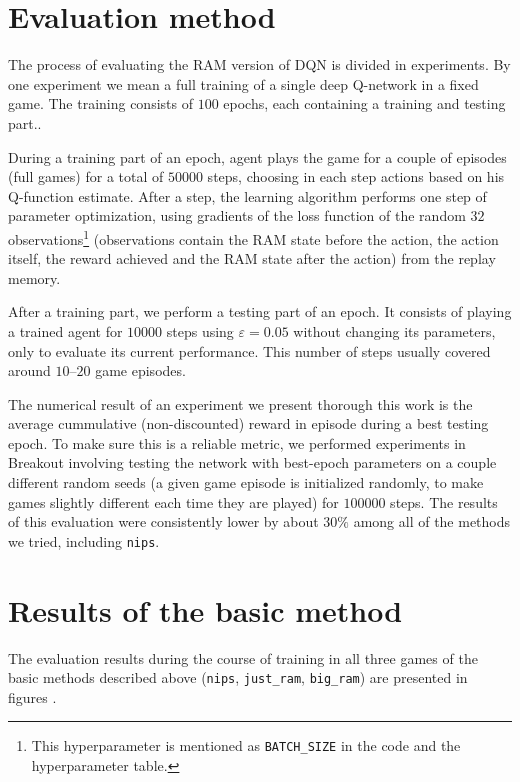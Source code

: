 \section{Evaluation method}
The process of evaluating the RAM version of DQN is divided in experiments. By one experiment we mean a full training of a single deep Q-network in a fixed game. The training consists of $100$ epochs, each containing a training and testing part..

During a training part of an epoch, agent plays the game for a couple of episodes (full games) for a total of $50000$ steps, choosing in each step actions based on his Q-function estimate. After a step, the learning algorithm performs one step of parameter optimization, using gradients of the loss function of the random $32$ observations\footnote{This hyperparameter is mentioned as \texttt{BATCH\_SIZE} in the code and the hyperparameter table.} (observations contain the RAM state before the action, the action itself, the reward achieved and the RAM state after the action) from the replay memory.

After a training part, we perform a testing part of an epoch. It consists of playing a trained agent for $10000$ steps using $\varepsilon=0.05$ without changing its parameters, only to evaluate its current performance. This number of steps usually covered around $10$--$20$ game episodes.

The numerical result of an experiment we present thorough this work is the average cummulative (non-discounted) reward in episode during a best testing epoch. To make sure this is a reliable metric, we performed experiments in Breakout involving testing the network with best-epoch parameters on a couple different random seeds (a given game episode is initialized randomly, to make games slightly different each time they are played) for $100000$ steps. The results of this evaluation were consistently lower by about $30\%$ among all of the methods we tried, including \texttt{nips}.

\section{Results of the basic method}
The evaluation results during the course of training in all three games of the basic methods described above (\texttt{nips}, \texttt{just\_ram}, \texttt{big\_ram}) are presented in figures .

